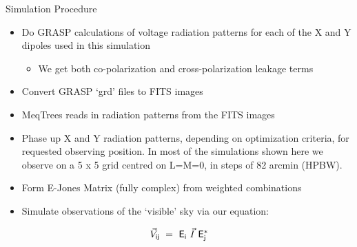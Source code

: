 \documentclass[pdf,azure,slideColor,colorBG]{prosper}
\begin{document}
\begin{slide}{Simulation Procedure}
\begin{small}
\begin{itemize}
\item Do GRASP calculations of voltage radiation patterns for each of the 
X and Y dipoles used in this simulation
\begin {itemize}
\item We get both co-polarization and cross-polarization leakage terms
\end{itemize}
\item Convert GRASP `grd' files to FITS images
\item MeqTrees reads in radiation patterns from the FITS images
\item Phase up X and Y radiation patterns, depending on optimization criteria,
for requested observing position. In most of the simulations shown here
we observe on a 5 x 5 grid centred on L=M=0, in steps of 82 arcmin (HPBW).
\item Form E-Jones Matrix (fully complex) from weighted combinations
\item Simulate observations of the `visible' sky via our equation:
\end{itemize}
\begin{displaymath}
  {\vec{V}}_{{\sf i}{\sf j}} 
  ~= 
  ~{\sf E}_{{\sf i}}
  ~{\vec{I}}
  ~{\sf E}_{{\sf j}}^\ast
\end{displaymath}
\end {small}
\end{slide}
\end{document}
